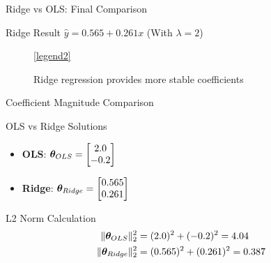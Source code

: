 \documentclass{beamer}
\begin{document}
\begin{frame}{Ridge vs OLS: Final Comparison}
\begin{theorembox}{Ridge Result}
$\hat{y} = 0.565 + 0.261x$ \quad (With $\lambda = 2$)
\end{theorembox}

\begin{figure}
\centering
{}
\vspace{-0.3cm}
\ref{legend2}
\caption{{\small Ridge regression provides more stable coefficients}}
\end{figure}
\end{frame}

\begin{frame}{Coefficient Magnitude Comparison}
\begin{theorembox}{OLS vs Ridge Solutions}
\begin{itemize}
\item \textbf{OLS}: $\boldsymbol{\theta}_{OLS} = \begin{bmatrix} 2.0 \\ -0.2 \end{bmatrix}$ 
\item \textbf{Ridge}: $\boldsymbol{\theta}_{Ridge} = \begin{bmatrix} 0.565 \\ 0.261 \end{bmatrix}$
\end{itemize}
\end{theorembox}
\pause

\begin{codebox}{L2 Norm Calculation}
\begin{align}
\|\boldsymbol{\theta}_{OLS}\|_2^2 &= (2.0)^2 + (-0.2)^2 = 4.04 \\
\|\boldsymbol{\theta}_{Ridge}\|_2^2 &= (0.565)^2 + (0.261)^2 = 0.387
\end{align}
\end{codebox}
\end{frame}
\end{document}
